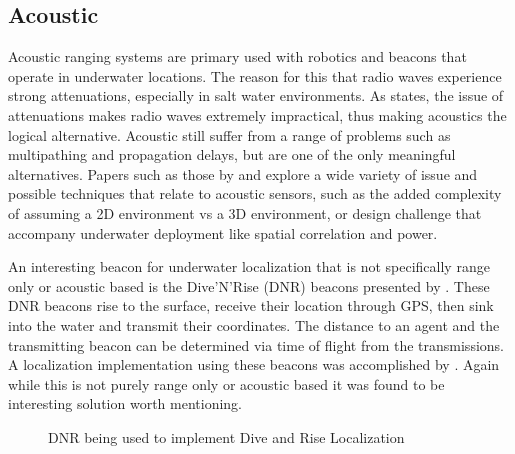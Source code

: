 \documentclass[conference]{IEEEtran}
\begin{document}
	\subsection{Acoustic}
	
	Acoustic ranging systems are primary used with robotics and beacons that operate in underwater locations. The reason for this that radio waves experience strong attenuations, especially in salt water environments. As \cite{Partan2007} states, the issue of attenuations makes radio waves extremely impractical, thus making acoustics the logical alternative. Acoustic still suffer from a range of problems such as multipathing and propagation delays, but are one of the only meaningful alternatives. Papers such as those by \cite{Erol-Kantarci2011} and \cite{Akyildiz2005} explore a wide variety of issue and possible techniques that relate to acoustic sensors, such as the added complexity of assuming a 2D environment vs a 3D environment, or design challenge that accompany underwater deployment like spatial correlation and power. 
  	
	An interesting beacon for underwater localization that is not specifically range only or acoustic based is the Dive'N'Rise (DNR) beacons presented by \cite{Erol2007}. These DNR beacons rise to the surface, receive their location through GPS, then sink into the water and transmit their coordinates. The distance to an agent and the transmitting beacon can be determined via time of flight from the transmissions. A localization implementation using these beacons was accomplished by \cite{Erol2008}. Again while this is not purely range only or acoustic based it was found to be interesting solution worth mentioning.
	
  	\begin{figure}[h!]
	
	\centering
	
	
	\caption{DNR being used to implement Dive and Rise Localization  \cite{Erol-Kantarci2011}}
	
	\label{DNR}
	
\end{figure}
\end{document}
